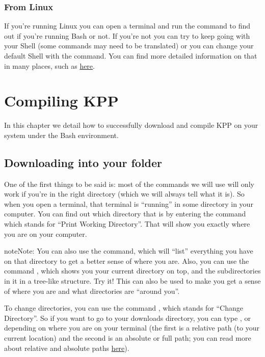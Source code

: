 \documentclass[letterpaper,10pt,openany,oneside]{sphinxmanual}
\begin{document}
\subsection{From Linux}
\label{bash:from-linux}
If you're running Linux you can open a terminal and run the command  to find out if you're running Bash or not. If you're not you can try to
keep going with your Shell (some commands may need to be translated) or you can
change your default Shell with the  command. You can find more detailed
information on that in many places, such as \href{http://stackoverflow.com/questions/13046192/changing-default-shell-in-linux}{here}.


\chapter{Compiling KPP}
\label{compiling::doc}\label{compiling:compiling-kpp}
In this chapter we detail how to successfully download and compile KPP
on your system under the Bash environment.


\section{Downloading into your folder}
\label{compiling:downloading-into-your-folder}
One of the first things to be said is: most of the commands we will use will
only work if you're in the right directory (which we will always tell what it
is). So when you open a terminal, that terminal is ``running'' in some directory
in your computer.  You can find out which directory that is by entering the
command  which stands for ``Print Working Directory''. That will show you
exactly where you are on your computer.

\begin{notice}{note}{Note:}
You can also use the  command, which will ``list'' everything you have on
that directory to get a better sense of where you are. Also, you can use the
command , which shows you your current directory on top, and
the subdirectories in it in a tree-like structure. Try it! This can also be used
to make you get a sense of where you are and what directories are ``around you''.
\end{notice}

To change directories, you can
use the command , which stands for ``Change Directory''. So if you want to
go to your downloads directory, you can type , or  depending on where you are on your terminal (the first
is a relative path (to your current location) and the second is an absolute or
full path; you can read more about relative and absolute paths \href{https://jeremywsherman.com/blog/2011/09/26/absolute-and-relative-paths/}{here}).
\end{document}
